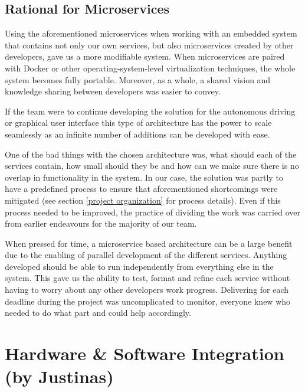 \documentclass[12pt]{article}
\begin{document}
\subsection {Rational for Microservices} \label{microservice rationale}

Using the aforementioned microservices when working with an embedded system that contains not only our own services, but also microservices created by other developers, gave us a more modifiable system. When microservices are paired with Docker or other operating-system-level virtualization techniques, the whole system becomes fully portable. Moreover, as a whole, a shared vision and knowledge sharing between developers was easier to convey. 

If the team were to continue developing the solution for the autonomous driving or graphical user interface this type of architecture has the power to scale seamlessly as an infinite number of additions can be developed with ease.

One of the bad things with the chosen architecture was, what should each of the services contain, how small should they be and how can we make sure there is no overlap in functionality in the system. In our case, the solution was partly to have a predefined process to ensure that aforementioned shortcomings were mitigated (see section \ref{project organization} for process details). Even if this process needed to be improved, the practice of dividing the work was carried over from earlier endeavours for the majority of our team. 

When pressed for time, a microservice based architecture can be a large benefit due to the enabling of parallel development of the different services. Anything developed should be able to run independently from everything else in the system. This gave us the ability to test, format and refine each service without having to worry about any other developers work progress. Delivering for each deadline during the project was uncomplicated to monitor, everyone knew who needed to do what part and could help accordingly.
\pagebreak

\section{Hardware \& Software Integration (by Justinas)}\label{hardware software integration}
\end{document}
